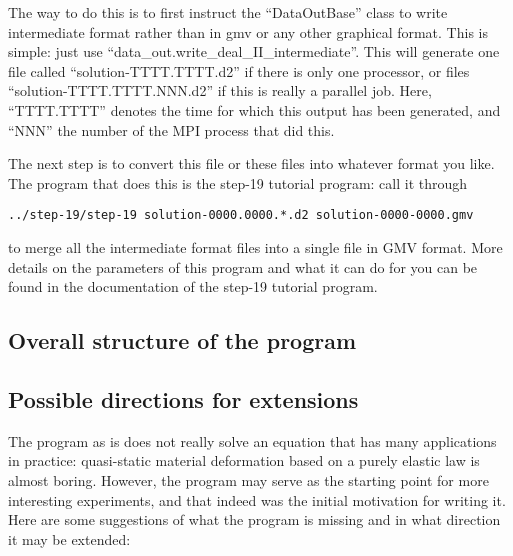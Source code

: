 \documentclass{article}
\begin{document}
The way to do this is to first instruct the ``DataOutBase'' class to
write intermediate format rather than in gmv or any other graphical
format. This is simple: just use
``data\_out.write\_deal\_II\_intermediate''. This will generate one file
called ``solution-TTTT.TTTT.d2'' if there is only one processor, or
files ``solution-TTTT.TTTT.NNN.d2'' if this is really a parallel
job. Here, ``TTTT.TTTT'' denotes the time for which this output has
been generated, and ``NNN'' the number of the MPI process that did this.

The next step is to convert this file or these files into whatever
format you like. The program that does this is the step-19 tutorial program:
call it through
\begin{center}
  \texttt{../step-19/step-19 solution-0000.0000.*.d2 solution-0000-0000.gmv}
\end{center}
to merge all the intermediate format files into a single file in GMV
format. More details on the parameters of this program and what it can do for
you can be found in the documentation of the step-19 tutorial program.



\subsection*{Overall structure of the program}
\subsection*{Possible directions for extensions}

The program as is does not really solve an equation that has many applications
in practice: quasi-static material deformation based on a purely elastic law
is almost boring. However, the program may serve as the starting point for
more interesting experiments, and that indeed was the initial motivation for
writing it. Here are some suggestions of what the program is missing and in
what direction it may be extended:
\end{document}
